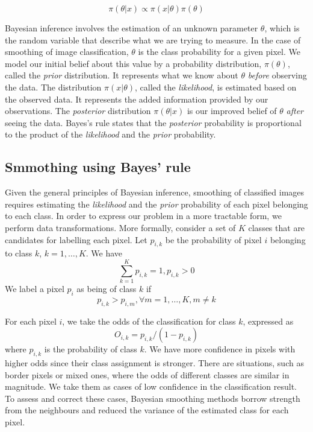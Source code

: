 \documentclass[a4paper,]{tufte-book}
\begin{document}
\[
\pi(\theta|x) \propto \pi(x|\theta)\pi(\theta)
\]

Bayesian inference involves the estimation of an unknown parameter \(\theta\), which is the random variable that describe what we are trying to measure. In the case of smoothing of image classification, \(\theta\) is the class probability for a given pixel. We model our initial belief about this value by a probability distribution, \(\pi(\theta)\), called the \emph{prior} distribution. It represents what we know about \(\theta\) \emph{before} observing the data. The distribution \(\pi(x|\theta)\), called the \emph{likelihood}, is estimated based on the observed data. It represents the added information provided by our observations. The \emph{posterior} distribution \(\pi(\theta|x)\) is our improved belief of \(\theta\) \emph{after} seeing the data. Bayes's rule states that the \emph{posterior} probability is proportional to the product of the \emph{likelihood} and the \emph{prior} probability.

\hypertarget{smmothing-using-bayes-rule}{%
\subsection{Smmothing using Bayes' rule}\label{smmothing-using-bayes-rule}}

Given the general principles of Bayesian inference, smoothing of classified images requires estimating the \emph{likelihood} and the \emph{prior} probability of each pixel belonging to each class. In order to express our problem in a more tractable form, we perform data transformations.
More formally, consider a set of \(K\) classes that are candidates for labelling each pixel. Let \(p_{i,k}\) be the probability of pixel \(i\) belonging to class \(k\), \(k = 1, \dots, K\). We have
\[
\sum_{k=1}^K p_{i,k} = 1, p_{i,k} > 0
\]
We label a pixel \(p_i\) as being of class \(k\) if
\[
    p_{i,k} > p_{i,m}, \forall m = 1, \dots, K, m \neq k
\]

For each pixel \(i\), we take the odds of the classification for class \(k\), expressed as
\[
    O_{i,k} = p_{i,k} / (1-p_{i,k})
\]
where \(p_{i,k}\) is the probability of class \(k\). We have more confidence in pixels with higher odds since their class assignment is stronger. There are situations, such as border pixels or mixed ones, where the odds of different classes are similar in magnitude. We take them as cases of low confidence in the classification result. To assess and correct these cases, Bayesian smoothing methods borrow strength from the neighbours and reduced the variance of the estimated class for each pixel.
\end{document}
